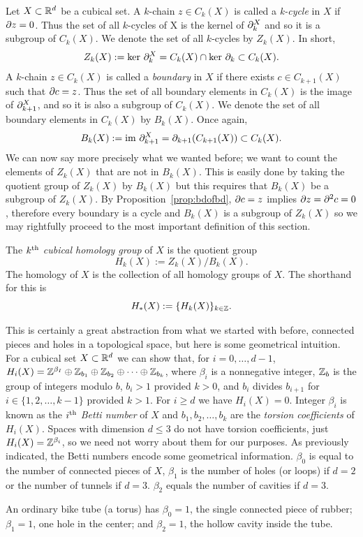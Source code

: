 Let $X \subset \mathbb{R}^d$ be a cubical set. A $k$-chain $z \in C_k(X)$ is called a \textit{k-cycle} in $X$ if $\partial z = 0$. Thus the set of all $k$-cycles of X is the kernel of $\partial_k^X$ and so it is a subgroup of $C_k(X)$. We denote the set of all $k$-cycles by $Z_k(X)$. In short,
%
\begin{align}
	Z_k(X) := \text{ker } \partial_k^X = C_k(X) \cap \text{ker } \partial_k \subset C_k(X).
\end{align}
%
A $k$-chain $z \in C_k(X)$ is called a \textit{boundary} in $X$ if there exists $c \in C_{k+1}(X)$ such that $\partial c = z$. Thus the set of all boundary elements in $C_k(X)$ is the image of $\partial_{k+1}^X$, and so it is also a subgroup of $C_k(X)$. We denote the set of all boundary elements in $C_k(X)$ by $B_k(X)$. Once again,
%
\begin{align}
	B_k(X) := \text{im } \partial_{k+1}^X = \partial_{k+1} (C_{k+1}(X)) \subset C_k(X).
\end{align}
%
We can now say more precisely what we wanted before; we want to count the elements of $Z_k(X)$ that are not in $B_k(X)$. This is easily done by taking the quotient group of $Z_k(X)$ by $B_k(X)$ but this requires that $B_k(X)$ be a subgroup of $Z_k(X)$. By Proposition~\ref{prop:bdofbd}, $\partial c = z$ implies $\partial z = \partial^2 c = 0$, therefore every boundary is a cycle and $B_k(X)$ is a subgroup of $Z_k(X)$ so we may rightfully proceed to the most important definition of this section.

\begin{defn}
	The $k\textsuperscript{th}$ \textit{cubical homology group} of $X$ is the quotient group
	$$ H_k(X) := Z_k(X) / B_k(X). $$
	The homology of $X$ is the collection of all homology groups of $X$. The shorthand for this is
	$$ H_{*}(X) := \{ H_k(X) \}_{k \in \mathbb{Z}} .$$
\end{defn}

This is certainly a great abstraction from what we started with before, connected pieces and holes in a topological space, but here is some geometrical intuition. For a cubical set $X \subset \mathbb{R}^d$ we can show that, for $i = 0, \ldots, d-1$, $H_i(X) = \mathbb{Z}^{\beta_I} \oplus \mathbb{Z}_{b_1} \oplus \mathbb{Z}_{b_2} \oplus \cdots \oplus \mathbb{Z}_{b_k}$, where $\beta_i$ is a nonnegative integer, $\mathbb{Z}_b$ is the group of integers modulo $b$, $b_i > 1$ provided $k > 0$, and $b_i$ divides $b_{i+1}$ for $i \in \{ 1, 2, \ldots, k-1 \}$ provided $k > 1$. For $ i \geq d$ we have $H_i(X) = 0$. Integer $\beta_i$ is known as the $i\textsuperscript{th}$ \textit{Betti number} of $X$ and $b_1, b_2, \ldots, b_k$ are the \textit{torsion coefficients} of $H_i(X)$. Spaces with dimension $d \leq 3$ do not have torsion coefficients, just $H_i(X) = \mathbb{Z}^{\beta_i}$, so we need not worry about them for our purposes. As previously indicated, the Betti numbers encode some geometrical information. $\beta_0$ is equal to the number of connected pieces of $X$, $\beta_1$ is the number of holes (or loops) if $d = 2$ or the number of tunnels if $d = 3$. $\beta_2$ equals the number of cavities if $d=3$.

\begin{exmp}
	An ordinary bike tube (a torus) has $\beta_0 = 1$, the single connected piece of rubber; $\beta_1 = 1$, one hole in the center; and $\beta_2 = 1$, the hollow cavity inside the tube.
\end{exmp}



